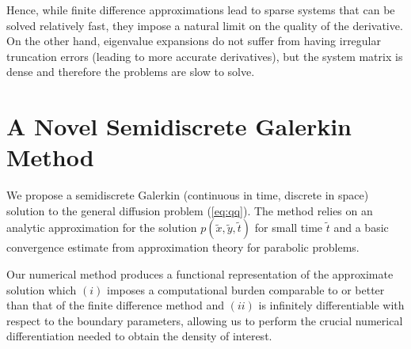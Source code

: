 Hence, while finite difference approximations lead to sparse systems
that can be solved relatively fast, they impose a natural limit on the
quality of the derivative. On the other hand, eigenvalue expansions do
not suffer from having irregular truncation errors (leading to more
accurate derivatives), but the system matrix is dense and therefore
the problems are slow to solve.



\section{A Novel Semidiscrete Galerkin
  Method} \label{sec:semidiscrete-galerkin} We propose a semidiscrete
Galerkin (continuous in time, discrete in space) solution to the
general diffusion problem (\ref{eq:qq}). The method relies on an
analytic approximation for the solution
$p(\tilde{x},\tilde{y},\tilde{t})$ for small time $\tilde{t}$ and a
basic convergence estimate from approximation theory for parabolic
problems.

Our numerical method produces a functional representation of the
approximate solution which $(i)$ imposes a computational burden
comparable to or better than that of the finite difference method and
$(ii)$ is infinitely differentiable with respect to the boundary
parameters, allowing us to perform the crucial numerical
differentiation needed to obtain the density of interest.

